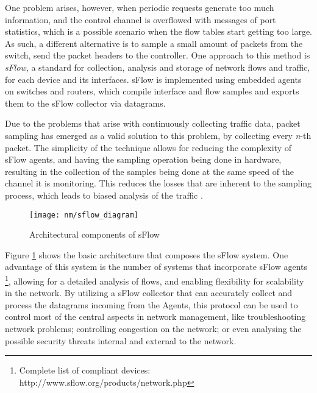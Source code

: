 One problem arises, however, when periodic requests generate too much information, and the control channel is overflowed with messages of port statistics, which is
a possible scenario when the flow tables start getting too large. As such, a different alternative is to sample a small amount of packets from the switch, send the
packet headers to the controller. One approach to this method is \textit{sFlow}, a standard for collection, analysis and storage of network flows and traffic, for 
each device and its interfaces. sFlow is implemented using embedded agents on switches and routers, which compile interface and flow samples and exports them to the 
sFlow collector via datagrams. 

\par Due to the problems that arise with continuously collecting traffic data, packet sampling has emerged as a valid solution to this problem, by collecting every
\textit{n}-th packet. The simplicity of the technique allows for reducing the complexity of sFlow agents, and having the sampling operation being done in 
hardware, resulting in the collection of the samples being done at the same speed of the channel it is monitoring. This reduces the losses that are inherent to the
sampling process, which leads to biased analysis of the traffic \cite{brauckhoff_impact_2006}.

\begin{figure} [!htbp]
    \centering
    \texttt{[image: nm/sflow\_diagram]}
    \caption{Architectural components of sFlow}
    \label{fig:sflow}
\end{figure}

\par Figure \ref{fig:sflow} shows the basic architecture that composes the sFlow system. One advantage of this system is the number of systems that incorporate sFlow
agents \footnote {Complete list of compliant devices: http://www.sflow.org/products/network.php}, allowing for a detailed analysis of flows, and enabling flexibility
for scalability in the network. By utilizing a sFlow collector that can accurately collect and process the datagrams incoming from the Agents, this protocol can be
used to control most of the central aspects in network management, like troubleshooting network problems; controlling congestion on the network; or even analysing
the possible security threats internal and external to the network.
